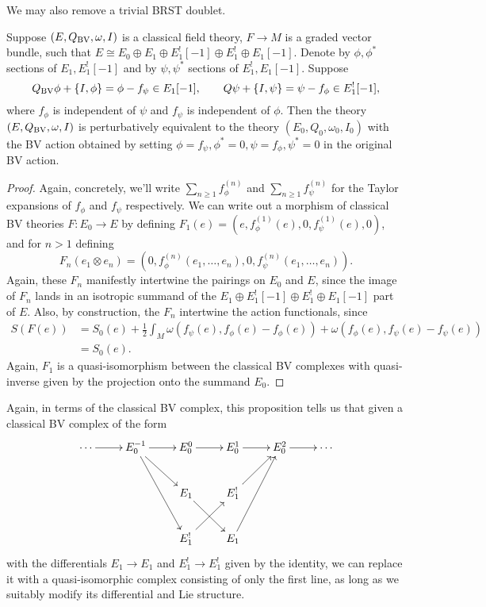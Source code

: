 \documentclass[10pt, oneside]{article}
\begin{document}
We may also remove a trivial BRST doublet.

\begin{prop}
Suppose $(E, Q_{\mathrm{BV}}, \omega, I)$ is a classical field theory, $F\rightarrow M$ is a graded vector bundle, such that $E\cong E_0\oplus E_1\oplus E_1^![-1]\oplus E_1^!\oplus E_1[-1]$. Denote by $\phi, \phi^*$ sections of $E_1,E_1^![-1]$ and by $\psi, \psi^*$ sections of $E_1^!, E_1[-1]$. Suppose
\[Q_{\mathrm{BV}}\phi + \{I, \phi\} = \phi - f_\psi \in E_1[-1] ,\qquad Q\psi + \{I, \psi\} = \psi - f_{\phi} \in E_1^![-1],\]
where $f_\phi$ is independent of $\psi$ and $f_{\psi}$ is independent of $\phi$. Then the theory $(E, Q_{\mathrm{BV}}, \omega, I)$ is perturbatively equivalent to the theory $(E_0, Q_0, \omega_0, I_0)$ with the BV action obtained by setting $\phi = f_\psi, \phi^* = 0,  \psi = f_\phi, \psi^* = 0$ in the original BV action.
\label{prop:BRSTdoublet}
\end{prop}

\begin{proof}
Again, concretely, we'll write $\sum_{n \ge 1} f^{(n)}_\phi$ and $\sum_{n \ge 1} f^{(n)}_{\psi}$ for the Taylor expansions of $f_\phi$ and $f_{\psi}$ respectively.  We can write out a morphism of classical BV theories $F \colon E_0 \to E$ by defining $F_1(e) = (e, f^{(1)}_{\phi}(e),0,f^{(1)}_\psi(e),0)$, and for $n > 1$ defining 
\[F_n(e_1\otimes e_n) = (0, f^{(n)}_{\phi}(e_1, \ldots, e_n), 0, f^{(n)}_{\psi}(e_1, \ldots, e_n)).\]
Again, these $F_n$ manifestly intertwine the pairings on $E_0$ and $E$, since the image of $F_n$ lands in an isotropic summand of the $E_1\oplus E_1^![-1]\oplus E_1^!\oplus E_1[-1]$ part of $E$.  Also, by construction, the $F_n$ intertwine the action functionals, since
\begin{align*}
S(F(e)) &= S_0(e) + \frac{1}{2} \int_M \omega(f_\psi(e), f_\phi(e) - f_\phi(e)) + \omega(f_\phi(e), f_\psi(e) - f_\psi(e)) \\
&= S_0(e).
\end{align*}
Again, $F_1$ is a quasi-isomorphism between the classical BV complexes with quasi-inverse given by the projection onto the summand $E_0$.
\end{proof}

\begin{remark}
Again, in terms of the classical BV complex, this proposition tells us that given a classical BV complex of the form
\[\xymatrix{
\cdots \ar[r] & E_0^{-1}\ar[r] \ar[dr] \ar[ddr] &E_0^0 \ar[r]  &E_0^1 \ar[r] &E_0^2 \ar[r] &\cdots \\
&&E_1 \ar^{~}[dr] &E_1^! \ar[ur] && \\
&&E_1^! \ar^{~}[ur] &E_1 \ar[uur] && \\
}\]
with the differentials $E_1 \to E_1$ and $E_1^! \to E_1^!$ given by the identity, we can replace it with a quasi-isomorphic complex consisting of only the first line, as long as we suitably modify its differential and Lie structure. 
\end{remark}
\end{document}
